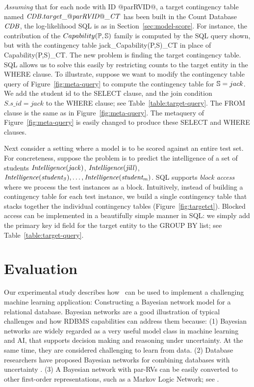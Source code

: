 \documentclass{IEEEtran}
\begin{document}
{\em Assuming} that for each node with ID @parRVID@, a target contingency table named $\CDB.target\_@\it{parRVID}@\_\cttable$ has been built in the Count Database $\CDB$, the log-likelihood SQL is as in Section~\ref{sec:model-score}. For instance, the contribution of the $Capability(\P,\S)$ family is computed by the SQL query shown,  but with the contingency table jack\_Capability(P,S)\_CT in place of Capability(P,S)\_CT.
The new problem is finding the target contingency table. SQL allows us to solve this easily by restricting counts to the target entity in the WHERE clause. To illustrate, suppose we want to modify the contingency table query of Figure~\ref{fig:meta-query} to compute the contingency table for $\S = jack$. We add the student id to the SELECT clause, and the join condition $S.s\_id = jack$ to the WHERE clause; see Table~\ref{table:target-query}.%
The FROM clause is the same as in Figure~\ref{fig:meta-query}. The metaquery of Figure~\ref{fig:meta-query} is easily changed to produce these SELECT and WHERE clauses.


Next consider a setting where a model is to be scored against an entire test set. 
For concreteness, suppose the problem is to predict the intelligence of a set of students
 $\it{Intelligence}(jack)$, $\it{Intelligence}(jill)$,
 $\it{Intelligence}(student_{3}),\ldots, \it{Intelligence}(student_{m})$.
 SQL supports {\em block access} where we process the test instances as a block. Intuitively, instead of building a contingency table for each test instance, we build a single contingency table that stacks together the individual contingency tables (Figure~\ref{fig:targetct}). Blocked access can be implemented in a beautifully simple manner in SQL: we simply add the primary key id field for the target entity to the GROUP BY list; see Table~\ref{table:target-query}. 


\section{Evaluation} 

Our experimental study describes how \FB\ can be used to implement a challenging machine learning application: Constructing a Bayesian network model for a relational database. Bayesian networks are a good illustration of typical challenges and how RDBMS capabilities can address them because: (1) Bayesian networks are widely regarded as a very useful model class in machine learning and AI, that supports decision making and reasoning under uncertainty. At the same time, they are considered challenging to learn from data. (2) Database researchers have proposed Bayesian networks for combining databases with uncertainty %
\cite{Wang2008}. (3) A Bayesian network with par-RVs can be easily converted to other first-order representations, such as a Markov Logic Network; see \cite{Domingos2009}.
\end{document}
